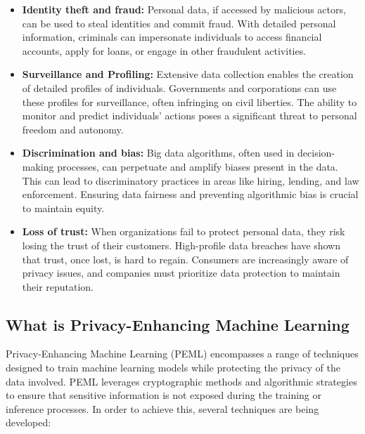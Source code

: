 \begin{itemize}
    \item \textbf{Identity theft and fraud:} Personal data, if accessed by malicious actors, can be used to steal identities and commit fraud. With detailed personal information, criminals can impersonate individuals to access financial accounts, apply for loans, or engage in other fraudulent activities.
    \item \textbf{Surveillance and Profiling:} Extensive data collection enables the creation of detailed profiles of individuals. Governments and corporations can use these profiles for surveillance, often infringing on civil liberties. The ability to monitor and predict individuals' actions poses a significant threat to personal freedom and autonomy.
    \item \textbf{Discrimination and bias:} Big data algorithms, often used in decision-making processes, can perpetuate and amplify biases present in the data. This can lead to discriminatory practices in areas like hiring, lending, and law enforcement. Ensuring data fairness and preventing algorithmic bias is crucial to maintain equity.
    \item \textbf{Loss of trust:} When organizations fail to protect personal data, they risk losing the trust of their customers. High-profile data breaches have shown that trust, once lost, is hard to regain. Consumers are increasingly aware of privacy issues, and companies must prioritize data protection to maintain their reputation.
\end{itemize}

\subsection{What is Privacy-Enhancing Machine Learning}

Privacy-Enhancing Machine Learning (PEML) encompasses a range of techniques designed to train machine learning models while protecting the privacy of the data involved. PEML leverages cryptographic methods and algorithmic strategies to ensure that sensitive information is not exposed during the training or inference processes. In order to achieve this, several techniques are being developed:\\

